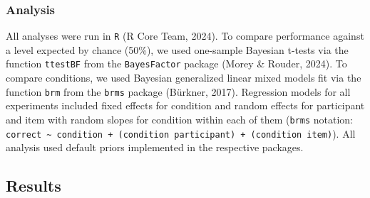 \documentclass[
  man,floatsintext]{apa6}
\begin{document}
\subsubsection{Analysis}\label{analysis}

All analyses were run in \texttt{R} (R Core Team, 2024). To compare performance against a level expected by chance (50\%), we used one-sample Bayesian t-tests via the function \texttt{ttestBF} from the \texttt{BayesFactor} package (Morey \& Rouder, 2024). To compare conditions, we used Bayesian generalized linear mixed models fit via the function \texttt{brm} from the \texttt{brms} package (Bürkner, 2017). Regression models for all experiments included fixed effects for condition and random effects for participant and item with random slopes for condition within each of them (\texttt{brms} notation: \texttt{correct\ \textasciitilde{}\ condition\ +\ (condition\ \textbar{}participant)\ +\ (condition\ \textbar{}item)}). All analysis used default priors implemented in the respective packages.

\subsection{Results}\label{results}
\end{document}
